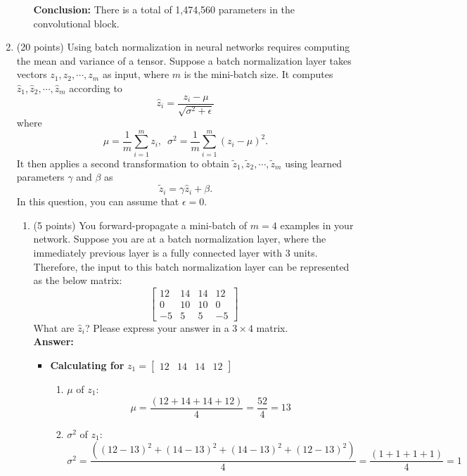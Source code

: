 \documentclass[11pt]{article}
\begin{document}
\begin{enumerate}
\begin{enumerate}
    \textbf{Conclusion:} There is a total of 1,474,560 parameters in the convolutional block.
    \end{enumerate}

    
    \item (20 points) Using batch normalization in neural networks requires computing
    the mean and variance of a tensor. Suppose a batch normalization
    layer takes vectors $z_1,z_2,\cdots,z_m$ as input, where $m$ is the
    mini-batch size. It computes $\hat z_1,\hat z_2,\cdots,\hat z_m$
    according to $$\hat z_i=\frac{z_i-\mu}{\sqrt{\sigma^2+\epsilon}}$$
    where $$\mu=\frac{1}{m}\sum_{i=1}^m
    z_i,\,\,\,\sigma^2=\frac{1}{m}\sum_{i=1}^m(z_i-\mu)^2.$$ It then
    applies a second transformation to obtain $\tilde z_1,\tilde
    z_2,\cdots,\tilde z_m$ using learned parameters $\gamma$ and $\beta$
    as $$\tilde z_i=\gamma \hat z_i+\beta.$$ In this question, you can
    assume that $\epsilon=0$.
    
    \begin{enumerate}
    \item (5 points) You forward-propagate a mini-batch of $m=4$ examples in your network. Suppose you are at a batch normalization layer, where the
    immediately previous layer is a fully connected layer with $3$ units. Therefore, the input to this batch normalization layer can be
    represented as the below matrix:
    $$\begin{bmatrix}
    12&14&14&12\\
    0&10&10&0\\
    -5&5&5&-5
    \end{bmatrix}$$ What are $\hat z_i$? Please express your answer in a $3\times 4$ matrix.\\

    \textbf{Answer: }

    \begin{itemize}
        \item \textbf{Calculating for} $z_1 = \begin{bmatrix}
            12&14&14&12
        \end{bmatrix}$

        \begin{enumerate}
            \item $\mu$ of $z_1$:
            \[\mu = \frac{(12 + 14 + 14 + 12)}{4} = \frac{52}{4} = 13\]

            \item $\sigma^2$ of $z_1$:
            \[\sigma^2 = \frac{((12-13)^2+(14-13)^2+(14-13)^2+(12-13)^2)}{4} = \frac{(1 + 1 + 1 + 1)}{4} = 1\]
        \end{enumerate}


\end{itemize}
\end{enumerate}
\end{enumerate}
\end{document}
